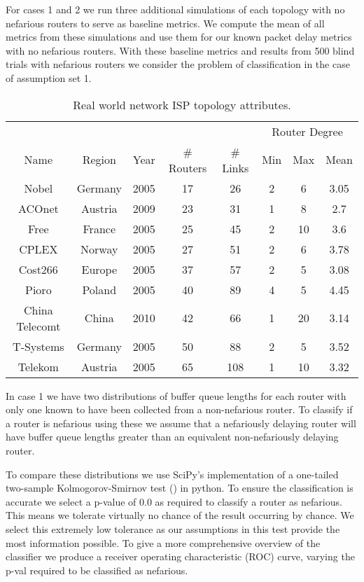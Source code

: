   For cases 1 and 2 we run three additional simulations of each topology with no nefarious routers to serve as baseline metrics. We compute the mean of all metrics from these simulations and use them for our known packet delay metrics with no nefarious routers. With these baseline metrics and results from 500 blind trials with nefarious routers we consider the problem of classification in the case of assumption set 1.\par
  \begin{table}
    \centering
    \begin{tabular}{@{}cccccccc@{}}
      \toprule
      &&&&&\multicolumn{3}{c}{Router Degree}\\
      \cmidrule{6-8}
      Name & Region & Year & \# Routers & \# Links & Min & Max & Mean \\
      \midrule
      Nobel & Germany & 2005 & 17 & 26 & 2 & 6 & 3.05\\
      ACOnet & Austria & 2009 & 23 & 31 & 1 & 8 & 2.7\\
      Free & France & 2005 & 25 & 45 & 2 & 10 & 3.6\\
      CPLEX & Norway & 2005 & 27 & 51 & 2 & 6 & 3.78\\
      Cost266 & Europe & 2005 & 37 & 57 & 2 & 5 & 3.08\\
      Pioro & Poland & 2005 & 40 & 89 & 4 & 5 & 4.45\\
      China Telecomt & China & 2010 & 42 & 66 & 1 & 20 & 3.14\\
      T-Systems & Germany & 2005 & 50 & 88 & 2 & 5 & 3.52\\
      Telekom & Austria & 2005 & 65 & 108 & 1 & 10 & 3.32\\
      \bottomrule
    \end{tabular}
    \caption{Real world network ISP topology attributes.}
    \label{tbl:Mrealnetworkattributes}
  \end{table}
  In case 1 we have two distributions of buffer queue lengths for each router with only one known to have been collected from a non-nefarious router. To classify if a router is nefarious using these we assume that a nefariously delaying router will have buffer queue lengths greater than an equivalent non-nefariously delaying router.\par
  To compare these distributions we use SciPy's implementation of a one-tailed two-sample Kolmogorov-Smirnov test (\cite{chakravarti_handbook_1967}) in python. To ensure the classification is accurate we select a p-value of 0.0 as required to classify a router as nefarious. This means we tolerate virtually no chance of the result occurring by chance. We select this extremely low tolerance as our assumptions in this test provide the most information possible. To give a more comprehensive overview of the classifier we produce a receiver operating characteristic (ROC) curve, varying the p-val required to be classified as nefarious.\par
